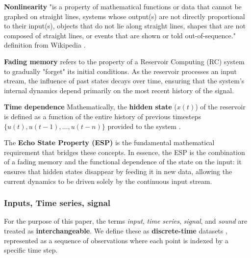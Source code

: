 \vspace{0.5cm}

\textbf{Nonlinearity} "is a property of mathematical functions or data that cannot be
graphed on straight lines, systems whose output(s) are not directly proportional to
their input(s), objects that do not lie along straight lines, shapes that are not composed of straight lines, or events that are shown or told out-of-sequence." definition from Wikipedia \cite{WikiNonlinearity}.

\vspace{0.5cm}

\textbf{Fading memory} refers to the property of a Reservoir Computing (RC) system to gradually "forget" its initial conditions\cite{Jaeger10ESN}. As the reservoir processes an input stream, the influence of past states decays over time, ensuring that the system's internal dynamics depend primarily on the most recent history of the signal. 

\vspace{0.3cm}

\textbf{Time dependence} Mathematically, the \textbf{hidden state} ($x(t)$) of the reservoir is defined as a function of the entire history of previous timesteps $\{u(t), u(t-1), \dots, u(t - n)\}$ provided to the system \cite{peixeiro2022time}. 

\vspace{0.3cm}

The \textbf{Echo State Property (ESP)} is the fundamental mathematical requirement that bridges these concepts. In essence, the ESP is the combination of a fading memory and the functional dependence of the state on the input: it ensures that hidden states disappear by feeding it in new data, allowing the current dynamics to be driven solely by the continuous input stream.

\vspace{0.5cm}

\subsubsection{Inputs, Time series, signal}

For the purpose of this paper, the terms \textit{input}, \textit{time series}, \textit{signal}, and \textit{sound} are treated as \textbf{interchangeable}. We define these as \textbf{discrete-time} datasets \cite{zolzer2002dafx}, represented as a sequence of observations where each point is indexed by a specific time step.

